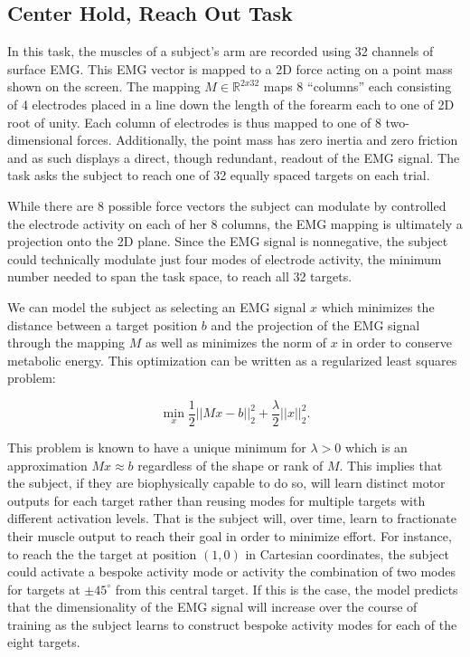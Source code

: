 \documentclass[
  a4paper,
]{article}
\begin{document}
\hypertarget{center-hold-reach-out-task}{%
\subsection{Center Hold, Reach Out
Task}\label{center-hold-reach-out-task}}

In this task, the muscles of a subject's arm are recorded using 32
channels of surface EMG. This EMG vector is mapped to a 2D force acting
on a point mass shown on the screen. The mapping
\(M\in\mathbb{R}^{2x32}\) maps 8 ``columns'' each consisting of 4
electrodes placed in a line down the length of the forearm each to one
of 2D root of unity. Each column of electrodes is thus mapped to one of
8 two-dimensional forces. Additionally, the point mass has zero inertia
and zero friction and as such displays a direct, though redundant,
readout of the EMG signal. The task asks the subject to reach one of 32
equally spaced targets on each trial.

While there are 8 possible force vectors the subject can modulate by
controlled the electrode activity on each of her 8 columns, the EMG
mapping is ultimately a projection onto the 2D plane. Since the EMG
signal is nonnegative, the subject could technically modulate just four
modes of electrode activity, the minimum number needed to span the task
space, to reach all 32 targets.

We can model the subject as selecting an EMG signal \(x\) which
minimizes the distance between a target position \(b\) and the
projection of the EMG signal through the mapping \(M\) as well as
minimizes the norm of \(x\) in order to conserve metabolic energy. This
optimization can be written as a regularized least squares problem:

\[
\min_x\frac{1}{2}||Mx - b||^2_2 + \frac{\lambda}{2}||x||_2^2.
\]

This problem is known to have a unique minimum for \(\lambda>0\) which
is an approximation \(Mx\approx b\) regardless of the shape or rank of
\(M\). This implies that the subject, if they are biophysically capable
to do so, will learn distinct motor outputs for each target rather than
reusing modes for multiple targets with different activation levels.
That is the subject will, over time, learn to fractionate their muscle
output to reach their goal in order to minimize effort. For instance, to
reach the the target at position \((1,0)\) in Cartesian coordinates, the
subject could activate a bespoke activity mode or activity the
combination of two modes for targets at \(\pm45^\circ\) from this
central target. If this is the case, the model predicts that the
dimensionality of the EMG signal will increase over the course of
training as the subject learns to construct bespoke activity modes for
each of the eight targets.
\end{document}
